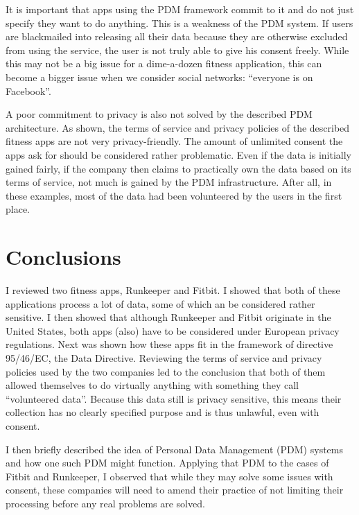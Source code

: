 \documentclass{article}
\begin{document}
It is important that apps using the PDM framework commit to it and do not just specify they want to do anything.
This is a weakness of the PDM system.
If users are blackmailed into releasing all their data because they are otherwise excluded from using the service, the user is not truly able to give his consent freely.
While this may not be a big issue for a dime-a-dozen fitness application, this can become a bigger issue when we consider social networks: ``everyone is on Facebook''.

A poor commitment to privacy is also not solved by the described PDM architecture.
As shown, the terms of service and privacy policies of the described fitness apps are not very privacy-friendly.
The amount of unlimited consent the apps ask for should be considered rather problematic.
Even if the data is initially gained fairly, if the company then claims to practically own the data based on its terms of service, not much is gained by the PDM infrastructure.
After all, in these examples, most of the data had been volunteered by the users in the first place.


\section{Conclusions}

I reviewed two fitness apps, Runkeeper and Fitbit.
I showed that both of these applications process a lot of data, some of which an be considered rather sensitive.
I then showed that although Runkeeper and Fitbit originate in the United States, both apps (also) have to be considered under European privacy regulations.
Next was shown how these apps fit in the framework of directive 95/46/EC, the Data Directive.
Reviewing the terms of service and privacy policies used by the two companies led to the conclusion that both of them allowed themselves to do virtually anything with something they call ``volunteered data''.
Because this data still is privacy sensitive, this means their collection has no clearly specified purpose and is thus unlawful, even with consent.

I then briefly described the idea of Personal Data Management (PDM) systems and how one such PDM might function.
Applying that PDM to the cases of Fitbit and Runkeeper, I observed that while they may solve some issues with consent, these companies will need to amend their practice of not limiting their processing before any real problems are solved.
\end{document}
